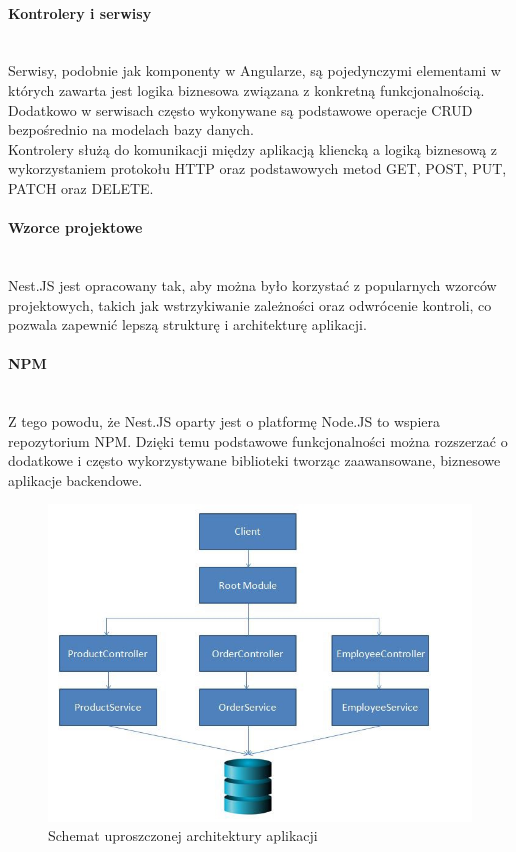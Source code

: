 \paragraph{Kontrolery i serwisy}\mbox{}\\
Serwisy, podobnie jak komponenty w Angularze, są pojedynczymi elementami w których zawarta jest logika biznesowa związana z konkretną funkcjonalnością. Dodatkowo w serwisach często wykonywane są podstawowe operacje CRUD bezpośrednio na modelach bazy danych. \\
Kontrolery służą do komunikacji między aplikacją kliencką a logiką biznesową z wykorzystaniem protokołu HTTP oraz podstawowych metod GET, POST, PUT, PATCH oraz DELETE.

\paragraph{Wzorce projektowe}\mbox{}\\
Nest.JS jest opracowany tak, aby można było korzystać z popularnych wzorców projektowych, takich jak wstrzykiwanie zależności oraz odwrócenie kontroli, co pozwala zapewnić lepszą strukturę i architekturę aplikacji.

\paragraph{NPM}\mbox{}\\
Z tego powodu, że Nest.JS oparty jest o platformę Node.JS to wspiera repozytorium NPM. Dzięki temu podstawowe funkcjonalności można rozszerzać o dodatkowe i często wykorzystywane biblioteki tworząc zaawansowane, biznesowe aplikacje backendowe.

\begin{figure}[ht]
	\centering
		\includegraphics[width=0.6\linewidth]{imgs/nest-diag.jpeg}
	\caption{Schemat uproszczonej architektury aplikacji}
	\label{fig:nest-uproszczona-architektura}
\end{figure}

